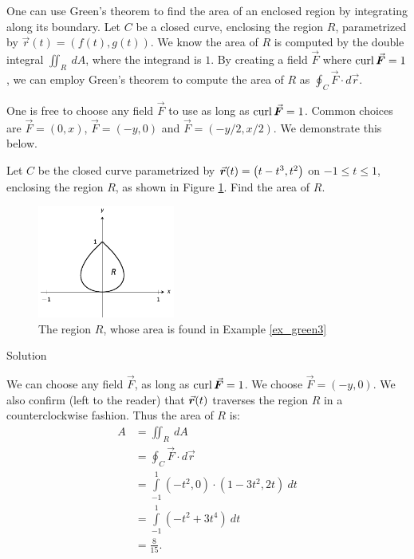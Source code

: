 One can use Green's theorem to find the area of an enclosed region by integrating along its boundary. Let $C$ be a closed curve, enclosing the region $R$, parametrized by $\vec r(t) = \left( f(t),g(t)\right)$. We know the area of $R$ is computed by the double integral $\iint_R \ dA$, where the integrand is $1$. By creating a field $\vec F$ where $\curl \vec F =1$, we can employ Green's theorem to compute the area of $R$ as $\oint_C \vec F\cdot d\vec r$. 

One is free to choose any field $\vec F$ to use as long as $\curl\vec F = 1$. Common choices are $\vec F = \left( 0,x\right)$, $\vec F = \left( -y,0\right)$ and $\vec F = \left( -y/2,x/2\right)$. We demonstrate this below.


\begin{example}
\label{ex_green3}
Let $C$ be the closed curve parametrized by $\vrt = \left( t-t^3,t^2\right)$ on $-1\leq t\leq 1$, enclosing the region $R$, as shown in Figure \ref{fig_Vector_Calc_16}. Find the area of $R$. 


\begin{figure}[H]
	\begin{center}
			\includegraphics[width=0.4\textwidth]{fig_Vector_Calc_16}
	\caption{The region $R$, whose area is found in Example \ref{ex_green3}}
	\label{fig_Vector_Calc_16}
	\end{center}
\end{figure}


Solution 


We can choose any field $\vec F$, as long as $\curl \vec F = 1$. We choose $\vec F = \left( -y,0\right)$. We also confirm (left to the reader) that $\vrt$ traverses the region $R$ in a counterclockwise fashion. Thus the area of $R$ is:
\begin{align*}
A &= \iint_R\ dA \\
									&= \oint_C \vec F\cdot d\vec r\\
									&= \int\limits_{-1}^1 \left( -t^2,0\right)\cdot \left( 1-3t^2,2t\right)\ dt\\
									&= \int\limits_{-1}^1 \left(-t^2 + 3t^4\right)\ dt \\
									&= \frac8{15}.
\end{align*}
\end{example}

